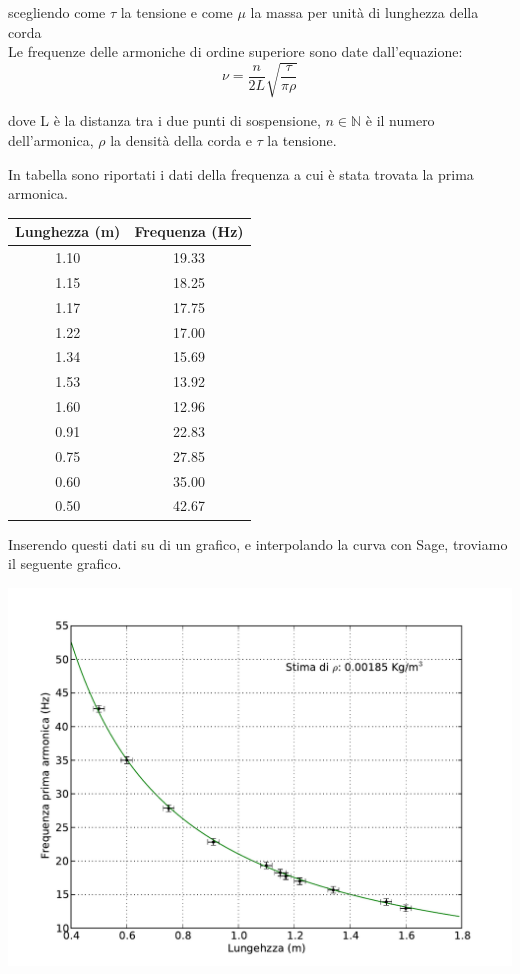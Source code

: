 \documentclass[a4paper,10pt]{report}
\begin{document}
scegliendo come $\tau$ la tensione e come $\mu$ la massa per unità di lunghezza della corda\\

Le frequenze delle armoniche di ordine superiore sono date dall'equazione:
\begin{equation}
\nu=\frac{n}{2L}\sqrt{\frac{\tau}{\pi\rho}}
\end{equation}

dove L è la distanza tra i due punti di sospensione, $n\in \mathbb{N}$ è il numero dell'armonica, $\rho$ la densità della corda e $\tau$ la tensione.

In tabella sono riportati i dati della frequenza a cui è stata trovata la prima armonica.

\begin{center}
\begin{tabular}{|c|c|}
\toprule
Lunghezza (m) & Frequenza (Hz) \\
\midrule
1.10 & 19.33 \\
1.15 & 18.25 \\
1.17 & 17.75 \\
1.22 & 17.00 \\
1.34 & 15.69 \\
1.53 & 13.92 \\
1.60 & 12.96 \\
0.91 & 22.83 \\
0.75 & 27.85 \\
0.60 & 35.00 \\
0.50 & 42.67 \\
\bottomrule
\end{tabular}
\end{center}

Inserendo questi dati su di un grafico, e interpolando la curva con Sage, troviamo il seguente grafico.

\includegraphics[scale=0.75]{"../grafici/CordaPrimaArmonica"}
\end{document}
